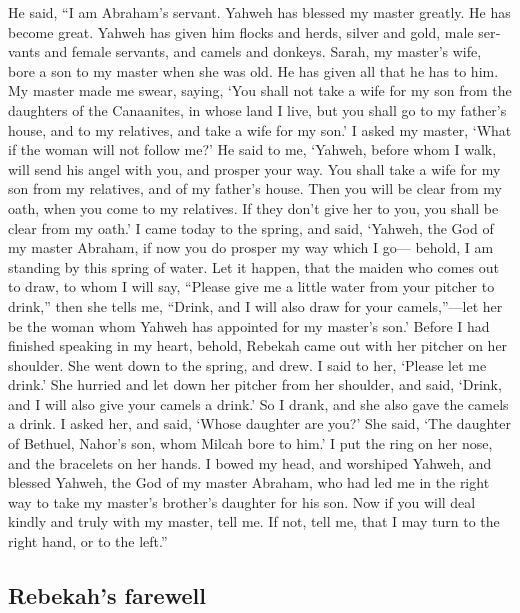 \begin{paracol}{2}
\begin{otherlanguage}{english}
 He said, ``I am Abraham's servant. 
Yahweh has blessed my master greatly. He has become great. Yahweh has
given him flocks and herds, silver and gold, male servants and female
servants, and camels and donkeys.  Sarah, my master's
wife, bore a son to my master when she was old. He has given all that he
has to him.  My master made me swear, saying, `You shall
not take a wife for my son from the daughters of the Canaanites, in
whose land I live,  but you shall go to my father's
house, and to my relatives, and take a wife for my son.' 
I asked my master, `What if the woman will not follow me?'
 He said to me, `Yahweh, before whom I walk, will send
his angel with you, and prosper your way. You shall take a wife for my
son from my relatives, and of my father's house.  Then
you will be clear from my oath, when you come to my relatives. If they
don't give her to you, you shall be clear from my oath.' 
I came today to the spring, and said, `Yahweh, the God of my master
Abraham, if now you do prosper my way which I go--- 
behold, I am standing by this spring of water. Let it happen, that the
maiden who comes out to draw, to whom I will say, ``Please give me a
little water from your pitcher to drink,''  then she
tells me, ``Drink, and I will also draw for your camels,''---let her be
the woman whom Yahweh has appointed for my master's son.'
 Before I had finished speaking in my heart, behold,
Rebekah came out with her pitcher on her shoulder. She went down to the
spring, and drew. I said to her, `Please let me drink.' 
She hurried and let down her pitcher from her shoulder, and said,
`Drink, and I will also give your camels a drink.' So I drank, and she
also gave the camels a drink.  I asked her, and said,
`Whose daughter are you?' She said, `The daughter of Bethuel, Nahor's
son, whom Milcah bore to him.' I put the ring on her nose, and the
bracelets on her hands.  I bowed my head, and worshiped
Yahweh, and blessed Yahweh, the God of my master Abraham, who had led me
in the right way to take my master's brother's daughter for his son.
 Now if you will deal kindly and truly with my master,
tell me. If not, tell me, that I may turn to the right hand, or to the
left.''

\hypertarget{rebekahs-farewell}{%
\subsection{Rebekah's farewell}\label{rebekahs-farewell}}


\end{otherlanguage}
\end{paracol}
